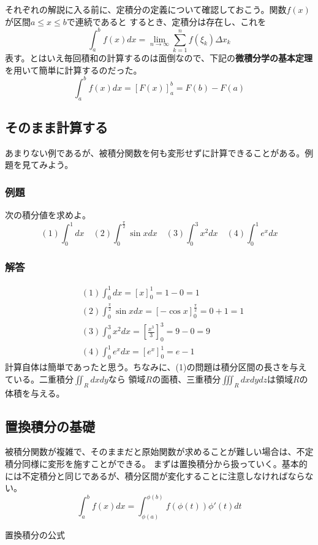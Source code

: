 \documentclass[a4j,dvipdfmx]{jsarticle}
\begin{document}
それぞれの解説に入る前に、定積分の定義について確認しておこう。関数$f(x)$が区間$a\leq x\leq b$で連続であると
するとき、定積分は存在し、これを
\begin{equation*}
    \int_a^b f(x)dx=\lim_{n\to\infty}\sum_{k=1}^{n}f(\xi_k)\Delta x_k
\end{equation*}
表す。とはいえ毎回積和の計算するのは面倒なので、下記の\textbf{微積分学の基本定理}を用いて簡単に計算するのだった。
\begin{equation*}
    \int_a^b f(x)dx=\left[F(x)\right]_a^b =F(b)-F(a)
\end{equation*}

\subsection{そのまま計算する}
あまりない例であるが、被積分関数を何も変形せずに計算できることがある。例題を見てみよう。
\subsubsection*{例題}
次の積分値を求めよ。
\begin{equation*}
    (1)\int_0^1 dx\quad (2)\int_0^{\frac{\pi}{2}}\sin xdx\quad(3)\int_0^3 x^2dx\quad(4)\int_0^1e^xdx
\end{equation*}
\subsubsection*{解答}
\begin{align*}
    &(1)\int_0^1 dx=\left[x\right]_0^1=1-0=1\\
    &(2)\int_0^{\frac{\pi}{2}}\sin xdx=\left[-\cos x\right]_0^{\frac{\pi}{2}}=0+1=1\\
    &(3)\int_0^3x^2dx=\left[\frac{x^3}{3}\right]_0^3=9-0=9\\
    &(4)\int_0^1e^xdx=\left[e^x\right]_0^1=e-1
\end{align*}
計算自体は簡単であったと思う。ちなみに、(1)の問題は積分区間の長さを与えている。二重積分$\displaystyle \iint_R dxdy$なら
領域$R$の面積、三重積分$\displaystyle \iiint_R dxdydz$は領域$R$の体積を与える。
\newpage
\subsection{置換積分の基礎}
被積分関数が複雑で、そのままだと原始関数が求めることが難しい場合は、不定積分同様に変形を施すことができる。
まずは置換積分から扱っていく。基本的には不定積分と同じであるが、積分区間が変化することに注意しなければならない。
\\
\begin{equation*}
    \int_a^b f(x)dx=\int_{\phi(a)}^{\phi(b)} f(\phi(t))\phi'(t)dt
\end{equation*}
\centerline{置換積分の公式}
\end{document}
